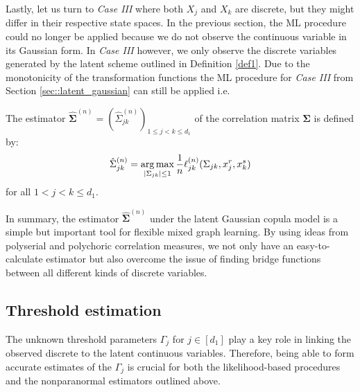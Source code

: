 Lastly, let us turn to \textit{Case III} where both $X_j$ and $X_k$ are discrete, but they might differ in their respective state spaces. In the previous section, the ML procedure could no longer be applied because we do not observe the continuous variable in its Gaussian form. In \textit{Case III} however, we only observe the discrete variables generated by the latent scheme outlined in Definition \ref{def1}. Due to the monotonicity of the transformation functions the ML procedure for \textit{Case III} from Section \ref{sec::latent_gaussian} can still be applied i.e.

\begin{definition}
    The estimator $\hat{\mathbf{\Sigma}}^{(n)} = (\hat{\Sigma}_{jk}^{(n)})_{1\leq j < k\leq d_1}$ of the correlation matrix $\mathbf{\Sigma}$ is defined by:
    \begin{equation}
            \hat{\Sigma}_{jk}^{(n)} = \argmax_{\Abs{\Sigma_{jk}} \leq 1} \frac{1}{n} \ell_{jk}^{(n)}(\Sigma_{jk}, x_j^r,x_k^s)
    \end{equation}
    for all $1 < j < k \leq d_1 $.
\end{definition}

In summary, the estimator $\hat{\mathbf{\Sigma}}^{(n)}$ under the latent Gaussian copula model is a simple but important tool for flexible mixed graph learning. By using ideas from polyserial and polychoric correlation measures, we not only have an easy-to-calculate estimator but also overcome the issue of finding bridge functions between all different kinds of discrete variables.

\subsection{Threshold estimation}\label{sec::thresholds}

The unknown threshold parameters $\Gamma_j$ for \(j \in [d_1]\) play a key role in linking the observed discrete to the latent continuous variables. Therefore, being able to form accurate estimates of the $\Gamma_j$ is crucial for both the likelihood-based procedures and the nonparanormal estimators outlined above.

